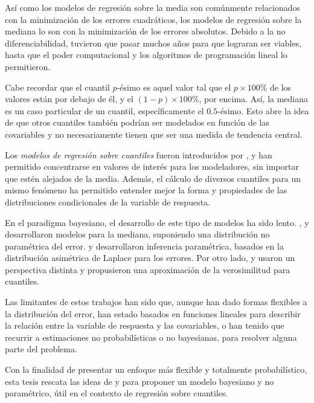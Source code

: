 As\'i como los modelos de regresi\'on sobre la media son com\'unmente relacionados con la minimizaci\'on de los errores cuadr\'aticos, los modelos de regresi\'on sobre la mediana lo son con la minimizaci\'on de los errores absolutos. Debido a la no diferenciabilidad, tuvieron que pasar muchos años para que lograran ser viables, hasta que el poder computacional y los algoritmos de programaci\'on lineal lo permitieron.

Cabe recordar que el cuantil $p$-\'esimo es aquel valor tal que el $p \times 100\%$ de los valores est\'an por debajo de \'el, y el $(1-p)\times 100\%$, por encima. As\'i, la mediana es un caso particular de un cuantil, espec\'ificamente el $0.5$-\'esimo. Esto abre la idea de que otros cuantiles tambi\'en podr\'ian ser modelados en funci\'on de las covariables y no necesariamente tienen que ser una medida de tendencia central. 

Los \textit{modelos de regresi\'on sobre cuantiles} fueron introducidos por \cite{Koenker_QuantReg}, y han permitido concentrarse en valores de inter\'es para los modeladores, sin importar que est\'en alejados de la media. Adem\'as, el c\'alculo de diversos cuantiles para un mismo fen\'omeno ha permitido entender mejor la forma y propiedades de las distribuciones condicionales de la variable de respuesta.

En el paradigma bayesiano, el desarrollo de este tipo de modelos ha sido lento. \cite{Walker_BayesAccFail}, \cite{Kottas_BaySemiparamMed} y \cite{Hanson_PolyaTrees} desarrollaron modelos para la mediana, suponiendo una distribuci\'on no param\'etrica del error. \cite{Yu_BayQuantReg} y \cite{Tsionas_BayQuantInf} desarrollaron inferencia param\'etrica, basados en la distribuci\'on asim\'etrica de Laplace para los errores. Por otro lado, \cite{Lavine_LikeQuant} y \cite{Dunson_ApproxBayes} usaron un perspectiva distinta y propusieron una aproximaci\'on de la verosimilitud para cuantiles.

Las limitantes de estos trabajos han sido que, aunque han dado formas flexibles a la distribuci\'on del error, han estado basados en funciones lineales para describir la relaci\'on entre la variable de respuesta y las covariables, o han tenido que recurrir a estimaciones no probabil\'isticas o no bayesianas, para resolver alguna parte del problema.

Con la finalidad de presentar un enfoque m\'as flexible y totalmente probabil\'istico, esta tesis rescata las ideas de \cite{Kottas_NotParamQuantReg} y \cite{Kottas_SemiparamQuantReg} para proponer un modelo bayesiano y no param\'etrico, \'util en el contexto de regresi\'on sobre cuantiles.

\newpage